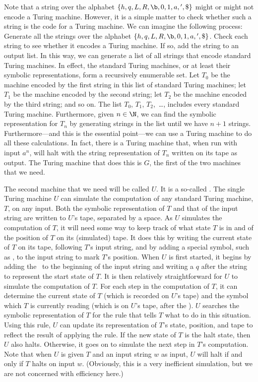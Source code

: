 Note that a string over the alphabet $\{h,q,L,R,\b,0,1,a,{}',\text{\$}\}$
might or might not encode a Turing machine.  However, it is a simple
matter to check whether such a string is the code for a Turing machine.
We can imagine the following process:  Generate all the strings over the
alphabet $\{h,q,L,R,\b,0,1,a,{}',\text{\$}\}$.  Check each string
to see whether it encodes a Turing machine.  If so, add the string
to an output list. In this way, we can generate a list of
all strings that encode standard Turing machines.  In effect,
the standard Turing machines, or at least their symbolic representations,
form a recursively enumerable set.  Let $T_0$ be the
machine encoded by the first string in this list of
standard Turing machines; let $T_1$ be
the machine encoded by the second string; let $T_2$ be the
machine encoded by the third string; and so on.  The list
$T_0$, $T_1$, $T_2$,~\dots, includes every standard Turing machine.
Furthermore, given $n\in\N$, we can find the symbolic representation
for $T_n$ by generating strings in the list until we have $n+1$ strings.
Furthermore---and this is the essential point---we can use a Turing
machine to do all these calculations.  In fact, there is
a Turing machine that, when run with input $a^n$, will halt with
the string representation of $T_n$ written on its tape as output.
The Turing machine that does this is $G$, the first of the
two machines that we need.

The second machine that we need will be called $U$.  It is a
so-called .  The single Turing machine
$U$ can simulate the computation of any standard Turing machine, $T$,
on any input.  Both the symbolic representation of $T$ and that of
the input string are written to $U$'s tape, separated by a
space.  As $U$ simulates the computation of $T$, it will need
some way to keep track of what state $T$ is in and of
the position of $T$ on its (simulated) tape.  It does this
by writing the current state of $T$ on its tape, following
$T$'s input string, and by adding a special symbol, such as \at,
to the input string to mark $T$'s position.  When $U$ is first
started, it begins by adding the \at\ to the beginning of the
input string and writing a $q$ after the string to represent
the start state of $T$.  It is then relatively straightforward
for $U$ to simulate the computation of $T$.  For each step
in the computation of $T$, it can determine the current state
of $T$ (which is recorded on $U$'s tape) and the symbol which
$T$ is currently reading (which is on $U$'s tape, after the \at).
$U$ searches the symbolic representation of $T$ for the
rule that tells $T$ what to do in this situation.  Using
this rule, $U$ can update its representation of $T$'s state,
position, and tape to reflect the result of applying the rule.
If the new state of $T$ is the halt state, then $U$ also halts.
Otherwise, it goes on to simulate the next step in $T$'s computation.
Note that when $U$ is given $T$ and an input string $w$ as
input, $U$ will halt if and only if $T$ halts on input $w$.
(Obviously, this is a very inefficient simulation, but we
are not concerned with efficiency here.)

